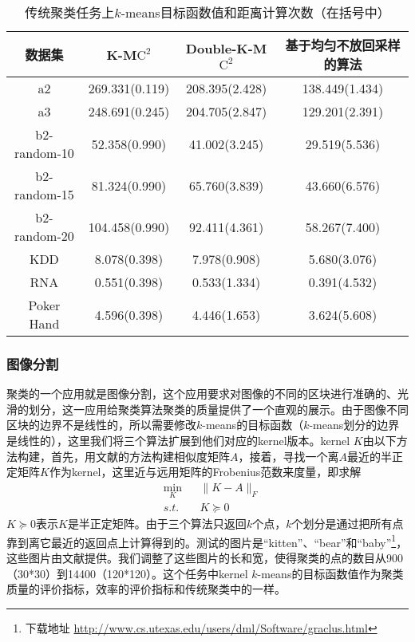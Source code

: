 \begin{table}[h]
	\caption{传统聚类任务上$k$-means目标函数值和距离计算次数（在括号中）}
	\label{tab:results on synthetic data}
	\begin{tabular}{cccc}
		\toprule
		数据集 & K-M$\text{C}^2$ & Double-K-M$\text{C}^2$ & 基于均匀不放回采样的算法 \\
		\midrule
		a2 & 269.331(0.119) & 208.395(2.428) & 138.449(1.434) \\
		a3 & 248.691(0.245) & 204.705(2.847) & 129.201(2.391) \\
		b2-random-10 & 52.358(0.990) & 41.002(3.245) & 29.519(5.536) \\
		b2-random-15 & 81.324(0.990) & 65.760(3.839) & 43.660(6.576) \\
		b2-random-20 & 104.458(0.990) & 92.411(4.361) & 58.267(7.400) \\
		\midrule %
		KDD & 8.078(0.398) & 7.978(0.908) & 5.680(3.076) \\
		RNA & 0.551(0.398) & 0.533(1.334) & 0.391(4.532) \\
		Poker Hand & 4.596(0.398) & 4.446(1.653) & 3.624(5.608) \\			
		\bottomrule
	\end{tabular}
\end{table}

\subsubsection{图像分割}
聚类的一个应用就是图像分割，这个应用要求对图像的不同的区块进行准确的、光滑的划分，这一应用给聚类算法聚类的质量提供了一个直观的展示。由于图像不同区块的边界不是线性的，所以需要修改$k$-means的目标函数（$k$-means划分的边界是线性的），这里我们将三个算法扩展到他们对应的kernel版本。kernel $K$由以下方法构建，首先，用文献\cite{stella2003multiclass}的方法构建相似度矩阵$A$，接着，寻找一个离$A$最近的半正定矩阵$K$作为kernel，这里近与远用矩阵的Frobenius范数来度量，即求解
\begin{equation}
	\begin{aligned}
		& \underset{K}{\text{min}} 
		& & \lVert K - A \rVert_F \\
		& s.t. 
		& & K \succeq 0
	\end{aligned}
\end{equation}
$K \succeq 0$表示$K$是半正定矩阵。由于三个算法只返回$k$个点，$k$个划分是通过把所有点靠到离它最近的返回点上计算得到的。测试的图片是“kitten”、“bear”和“baby”\footnote{下载地址 \url{http://www.cs.utexas.edu/users/dml/Software/graclus.html}}，这些图片由文献\cite{dhillon2004kernel}提供。我们调整了这些图片的长和宽，使得聚类的点的数目从900（30*30）到14400（120*120）。这个任务中kernel $k$-means的目标函数值作为聚类质量的评价指标，效率的评价指标和传统聚类中的一样。

